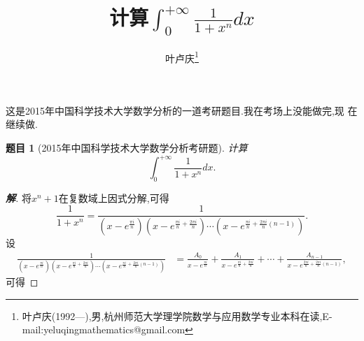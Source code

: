 \documentclass[a4paper]{article}
\newtheorem*{exe}{题目}
\newenvironment{exercise}
{\bigskip\begin{mdframed}\begin{exe}}
    {\end{exe}\end{mdframed}\bigskip}
\begin{document}
\title{\bf{计算$\displaystyle\int_0^{+\infty}\frac{1}{1+x^n}dx$}} \author{\small{叶卢庆\footnote{叶卢庆(1992---),男,杭州师范大学理学院数学与应用数学专业本科在读,E-mail:yeluqingmathematics@gmail.com}}}
\maketitle
这是2015年中国科学技术大学数学分析的一道考研题目.我在考场上没能做完,现
在继续做.
\begin{exercise}[2015年中国科学技术大学数学分析考研题]
计算
$$
\int_0^{+\infty}\frac{1}{1+x^n}dx.
$$
\end{exercise}
\begin{proof}[\textbf{解}]
将$x^n+1$在复数域上因式分解,可得
$$
\frac{1}{1+x^n}=\frac{1}{(x-e^{\frac{\pi i}{n}})(x-e^{\frac{\pi
      i}{n}+\frac{2\pi i}{n}})\cdots (x-e^{\frac{\pi i}{n}+\frac{2\pi i}{n}(n-1)})}.
$$
设
\begin{align*}
  \frac{1}{(x-e^{\frac{\pi i}{n}})(x-e^{\frac{\pi
      i}{n}+\frac{2\pi i}{n}})\cdots (x-e^{\frac{\pi i}{n}+\frac{2\pi
      i}{n}(n-1)})}&=\frac{A_0}{x-e^{\frac{\pi
      i}{n}}}+\frac{A_1}{x-e^{\frac{\pi i}{n}+\frac{2\pi
      i}{n}}}+\cdots+\frac{A_{n-1}}{x-e^{\frac{2\pi i}{n}+\frac{2\pi i}{n}(n-1)}},
\end{align*}
可得
\end{proof}
\end{document}
